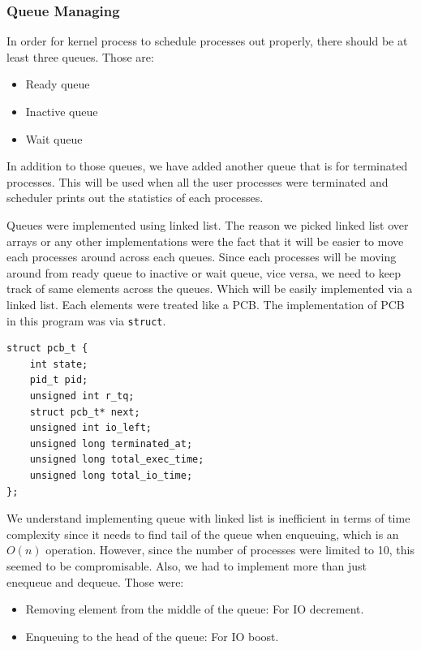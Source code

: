\documentclass{homework}
\begin{document}
\subsubsection{Queue Managing}
In order for kernel process to schedule processes out properly, there should be at least three queues. Those are:

\begin{itemize}
    \item Ready queue
    \item Inactive queue
    \item Wait queue
\end{itemize}

In addition to those queues, we have added another queue that is for terminated processes. This will be used when all the user processes were terminated and scheduler prints out the statistics of each processes.

Queues were implemented using linked list. The reason we picked linked list over arrays or any other implementations were the fact that it will be easier to move each processes around across each queues. Since each processes will be moving around from ready queue to inactive or wait queue, vice versa, we need to keep track of same elements across the queues. Which will be easily implemented via a linked list. Each elements were treated like a PCB. The implementation of PCB in this program was via \texttt{struct}.
\\
\begin{center}
\begin{code}
\begin{verbatim}
struct pcb_t {
    int state;
    pid_t pid;
    unsigned int r_tq;
    struct pcb_t* next;
    unsigned int io_left;
    unsigned long terminated_at;
    unsigned long total_exec_time;
    unsigned long total_io_time;
};
\end{verbatim}
\end{code}
\end{center}
We understand implementing queue with linked list is inefficient in terms of time complexity since it needs to find tail of the queue when enqueuing, which is an $O(n)$ operation. However, since the number of processes were limited to 10, this seemed to be compromisable. Also, we had to implement more than just enequeue and dequeue. Those were:
\begin{itemize}
    \item Removing element from the middle of the queue: For IO decrement.
    \item Enqueuing to the head of the queue: For IO boost.
\end{itemize}
\end{document}
